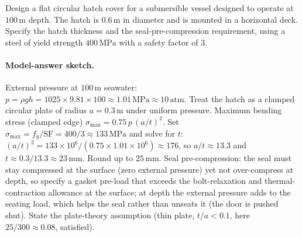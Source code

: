 \begin{exercise}
Design a flat circular hatch cover for a submersible vessel
designed to operate at $100\,\si{\meter}$ depth. The hatch is
$0.6\,\si{\meter}$ in diameter and is mounted in a horizontal
deck. Specify the hatch thickness and the seal-pre-compression
requirement, using a steel of yield strength $400\,\text{MPa}$
with a safety factor of $3$.

\paragraph{Model-answer sketch.} External pressure at $100\,\si{\meter}$
seawater: $p = \rho g h = 1025 \times 9.81 \times 100 \approx 1.01\,
\text{MPa} \approx 10\,\text{atm}$. Treat the hatch as a clamped
circular plate of radius $a = 0.3\,\si{\meter}$ under uniform pressure.
Maximum bending stress (clamped edge) $\sigma_{\max} = 0.75\, p\,
(a/t)^2$. Set $\sigma_{\max} = f_y/\text{SF} = 400/3 \approx 133\,\text{
MPa}$ and solve for $t$: $(a/t)^2 = 133\times10^6/(0.75 \times 1.01
\times10^6) \approx 176$, so $a/t \approx 13.3$ and $t \approx
0.3/13.3 \approx 23\,\si{\milli\meter}$. Round up to $25\,\si{
\milli\meter}$. Seal pre-compression: the seal must stay compressed at
the surface (zero external pressure) yet not over-compress at depth, so
specify a gasket pre-load that exceeds the bolt-relaxation and
thermal-contraction allowance at the surface; at depth the external
pressure adds to the seating load, which helps the seal rather than
unseats it (the door is pushed shut). State the plate-theory assumption
(thin plate, $t/a < 0.1$, here $25/300 \approx 0.08$, satisfied).
\end{exercise}

